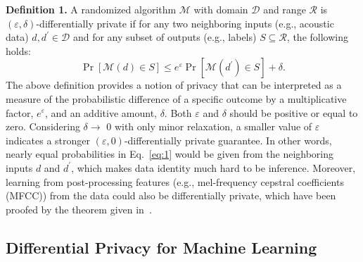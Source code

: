 \documentclass[a4paper]{article}
\begin{document}
\textbf{Definition 1.} A randomized algorithm $\mathcal{M}$ with domain $\mathcal{D}$ and range $\mathcal{R}$ is $(\varepsilon, \delta)$-differentially private if for any two neighboring inputs (e.g., acoustic data) $d, d^{\prime} \in \mathcal{D}$ and for any subset of outputs (e.g., labels) $S \subseteq \mathcal{R}$, the following holds:
\begin{equation}
\operatorname{Pr}[\mathcal{M}(d) \in S] \leq e^{\varepsilon} \operatorname{Pr}\left[\mathcal{M}\left(d^{\prime}\right) \in S\right]+\delta.
\label{eq:1}
\end{equation}
The above definition provides a notion of privacy that can be interpreted as a measure of the probabilistic difference of a specific outcome by a multiplicative factor, $e^{\varepsilon}$, and an additive amount, $\delta$. Both $\varepsilon$ and
$\delta$ should be positive or equal to zero. Considering $\delta\rightarrow$ 0 with only minor relaxation, a smaller value of $\varepsilon$ indicates a stronger $(\varepsilon, 0)$-differentially private guarantee. In other words, nearly equal probabilities in Eq.~\ref{eq:1} would be given from the neighboring inputs $d$ and $d^{\prime}$, which makes data identity much hard to be inference. Moreover, learning from post-processing features (e.g., mel-frequency cepstral coefficients (MFCC)) from the data could also be differentially private, which have been proofed by the theorem given in~\cite{dwork2008differential}.

\subsection{Differential Privacy for Machine Learning}
\end{document}
